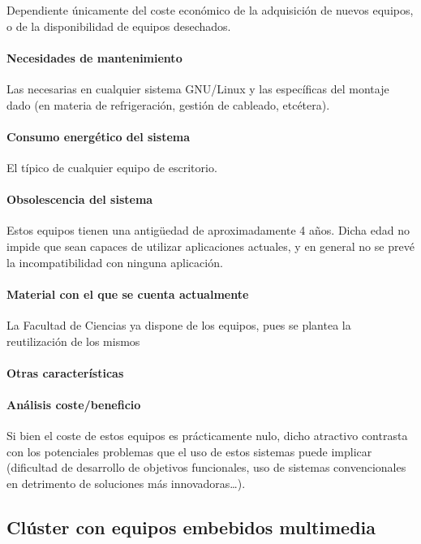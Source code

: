 Dependiente únicamente del coste económico de la adquisición de nuevos equipos, o de la disponibilidad de equipos desechados.

\paragraph{Necesidades de mantenimiento}

Las necesarias en cualquier sistema GNU/Linux y las específicas del montaje dado (en materia de refrigeración, gestión de cableado, etcétera).

\paragraph{Consumo energético del sistema}

El típico de cualquier equipo de escritorio.

\paragraph{Obsolescencia del sistema}

Estos equipos tienen una antigüedad de aproximadamente 4 años. Dicha edad no impide que sean capaces de utilizar aplicaciones actuales, y en general no se prevé la incompatibilidad con ninguna aplicación.

\paragraph{Material con el que se cuenta actualmente}
La Facultad de Ciencias ya dispone de los equipos, pues se plantea la reutilización de los mismos

\paragraph{Otras características}

\paragraph{Análisis coste/beneficio}

Si bien el coste de estos equipos es prácticamente nulo, dicho atractivo contrasta con los potenciales problemas que el uso de estos sistemas puede implicar (dificultad de desarrollo de objetivos funcionales, uso de sistemas convencionales en detrimento de soluciones más innovadoras\dots).

\subsection{Clúster con equipos embebidos multimedia }

